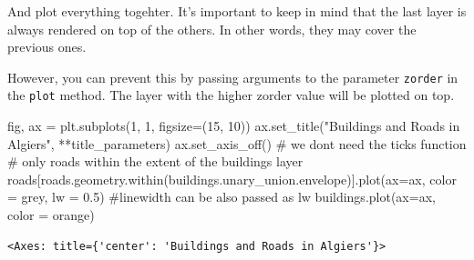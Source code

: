 \documentclass[
  letterpaper,
  DIV=11,
  numbers=noendperiod]{scrreprt}
\newenvironment{Shaded}{\begin{snugshade}}{\end{snugshade}}
\newcommand{\CommentTok}[1]{\textcolor[rgb]{0.37,0.37,0.37}{#1}}
\newcommand{\DecValTok}[1]{\textcolor[rgb]{0.68,0.00,0.00}{#1}}
\newcommand{\FloatTok}[1]{\textcolor[rgb]{0.68,0.00,0.00}{#1}}
\newcommand{\NormalTok}[1]{\textcolor[rgb]{0.00,0.23,0.31}{#1}}
\newcommand{\OperatorTok}[1]{\textcolor[rgb]{0.37,0.37,0.37}{#1}}
\newcommand{\StringTok}[1]{\textcolor[rgb]{0.13,0.47,0.30}{#1}}
\begin{document}
And plot everything togehter. It's important to keep in mind that the
last layer is always rendered on top of the others. In other words, they
may cover the previous ones.

However, you can prevent this by passing arguments to the parameter
\texttt{zorder} in the \texttt{plot} method. The layer with the higher
zorder value will be plotted on top.

\begin{Shaded}
\begin{Highlighting}[]
\NormalTok{fig, ax }\OperatorTok{=}\NormalTok{ plt.subplots(}\DecValTok{1}\NormalTok{, }\DecValTok{1}\NormalTok{, figsize}\OperatorTok{=}\NormalTok{(}\DecValTok{15}\NormalTok{, }\DecValTok{10}\NormalTok{))}
\NormalTok{ax.set\_title(}\StringTok{"Buildings and Roads in Algiers"}\NormalTok{, }\OperatorTok{**}\NormalTok{title\_parameters)}
\NormalTok{ax.set\_axis\_off() }\CommentTok{\# we don\textquotesingle{}t need the ticks function}
\CommentTok{\# only roads within the extent of the buildings layer}
\NormalTok{roads[roads.geometry.within(buildings.unary\_union.envelope)].plot(ax}\OperatorTok{=}\NormalTok{ax, color }\OperatorTok{=} \StringTok{\textquotesingle{}grey\textquotesingle{}}\NormalTok{, lw }\OperatorTok{=} \FloatTok{0.5}\NormalTok{) }\CommentTok{\#linewidth can be also passed as lw }
\NormalTok{buildings.plot(ax}\OperatorTok{=}\NormalTok{ax, color }\OperatorTok{=} \StringTok{\textquotesingle{}orange\textquotesingle{}}\NormalTok{)}
\end{Highlighting}
\end{Shaded}

\begin{verbatim}
<Axes: title={'center': 'Buildings and Roads in Algiers'}>
\end{verbatim}
\end{document}
